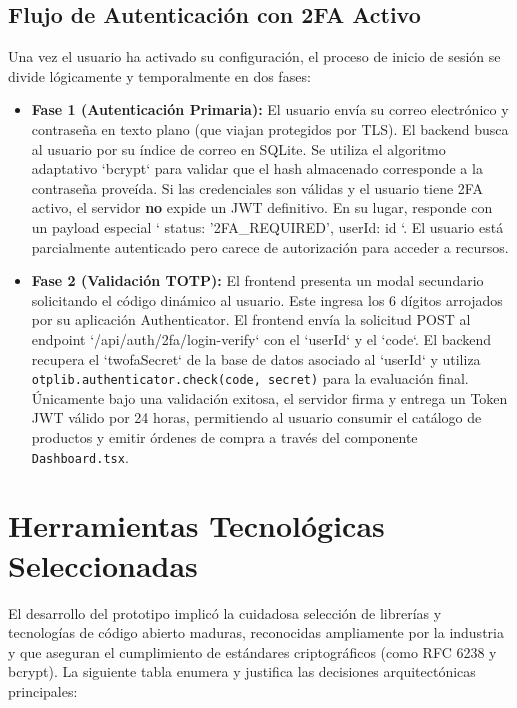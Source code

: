 \documentclass[12pt,a4paper]{article}
\begin{document}
\subsection{Flujo de Autenticación con 2FA Activo}
Una vez el usuario ha activado su configuración, el proceso de inicio de sesión se divide lógicamente y temporalmente en dos fases:
\begin{itemize}
    \item \textbf{Fase 1 (Autenticación Primaria):} El usuario envía su correo electrónico y contraseña en texto plano (que viajan protegidos por TLS). El backend busca al usuario por su índice de correo en SQLite. Se utiliza el algoritmo adaptativo `bcrypt` para validar que el hash almacenado corresponde a la contraseña proveída. Si las credenciales son válidas y el usuario tiene 2FA activo, el servidor \textbf{no} expide un JWT definitivo. En su lugar, responde con un payload especial `{ status: '2FA_REQUIRED', userId: id }`. El usuario está parcialmente autenticado pero carece de autorización para acceder a recursos.
    \item \textbf{Fase 2 (Validación TOTP):} El frontend presenta un modal secundario solicitando el código dinámico al usuario. Este ingresa los 6 dígitos arrojados por su aplicación Authenticator. El frontend envía la solicitud POST al endpoint `/api/auth/2fa/login-verify` con el `userId` y el `code`. El backend recupera el `twofaSecret` de la base de datos asociado al `userId` y utiliza \texttt{otplib.authenticator.check(code, secret)} para la evaluación final. Únicamente bajo una validación exitosa, el servidor firma y entrega un Token JWT válido por 24 horas, permitiendo al usuario consumir el catálogo de productos y emitir órdenes de compra a través del componente \texttt{Dashboard.tsx}.
\end{itemize}


\section{Herramientas Tecnológicas Seleccionadas}

El desarrollo del prototipo implicó la cuidadosa selección de librerías y tecnologías de código abierto maduras, reconocidas ampliamente por la industria y que aseguran el cumplimiento de estándares criptográficos (como RFC 6238 y bcrypt). La siguiente tabla enumera y justifica las decisiones arquitectónicas principales:
\end{document}
